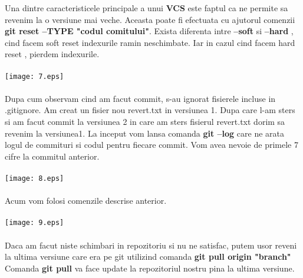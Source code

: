 \tab Una dintre caracteristicele principale a unui \textbf{VCS} este faptul ca
ne permite sa revenim la o versiune mai veche. Aceasta poate fi efectuata cu ajutorul
comenzii \textbf{git reset --TYPE "codul comitului"}. Exista diferenta intre 
\textbf{--soft} si \textbf{--hard} , cind facem soft reset indexurile ramin neschimbate.
Iar in cazul cind facem hard reset , pierdem indexurile.
\\
\\
\texttt{[image: 7.eps]}
\\
\\
Dupa cum observam cind am facut commit, s-au ignorat fisierele incluse in .gitignore.
\clearpage
\tab Am creat un fisier nou revert.txt in versiunea 1. Dupa care l-am sters si am facut
commit la versiunea 2 in care am sters fisierul revert.txt dorim sa revenim la versiunea1. La inceput vom lansa comanda \textbf{git --log} care ne arata logul de commituri si
codul pentru fiecare commit. Vom avea nevoie de primele 7 cifre la commitul anterior.\\
\\
\texttt{[image: 8.eps]}\\
\\
Acum vom folosi comenzile descrise anterior.\\
\\
\texttt{[image: 9.eps]}\\
\\
Daca am facut niste schimbari in repozitoriu si nu ne satisfac, putem usor reveni
la ultima versiune care era pe git utilizind comanda \textbf{git pull origin "branch"}
Comanda \textbf{git pull} va face update la repozitoriul nostru pina la ultima versiune.
